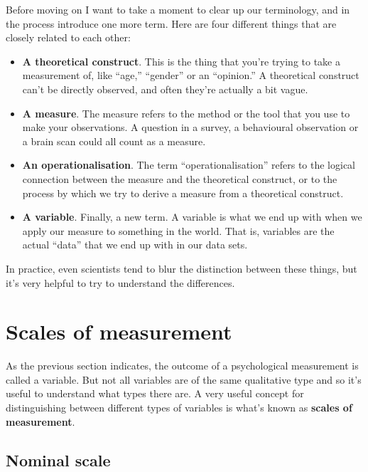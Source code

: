\documentclass[
]{book}
\providecommand{\tightlist}{%
  \setlength{\itemsep}{0pt}\setlength{\parskip}{0pt}}
\begin{document}
Before moving on I want to take a moment to clear up our terminology, and in the process introduce one more term. Here are four different things that are closely related to each other:

\begin{itemize}
\tightlist
\item
  {\textbf{A theoretical construct}}. This is the thing that you're trying to take a measurement of, like ``age,'' ``gender'' or an ``opinion.'' A theoretical construct can't be directly observed, and often they're actually a bit vague.
\item
  {\textbf{A measure}}. The measure refers to the method or the tool that you use to make your observations. A question in a survey, a behavioural observation or a brain scan could all count as a measure.
\item
  {\textbf{An operationalisation}}. The term ``operationalisation'' refers to the logical connection between the measure and the theoretical construct, or to the process by which we try to derive a measure from a theoretical construct.
\item
  {\textbf{A variable}}. Finally, a new term. A variable is what we end up with when we apply our measure to something in the world. That is, variables are the actual ``data'' that we end up with in our data sets.
\end{itemize}

In practice, even scientists tend to blur the distinction between these things, but it's very helpful to try to understand the differences.

\hypertarget{scales}{%
\section{Scales of measurement}\label{scales}}

As the previous section indicates, the outcome of a psychological measurement is called a variable. But not all variables are of the same qualitative type and so it's useful to understand what types there are. A very useful concept for distinguishing between different types of variables is what's known as {\textbf{scales of measurement}}.

\hypertarget{nominal-scale}{%
\subsection{Nominal scale}\label{nominal-scale}}
\end{document}
